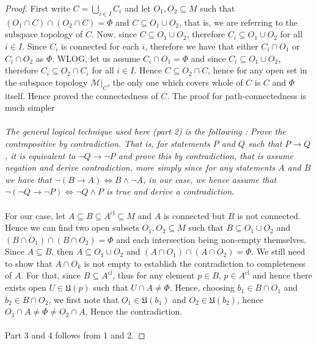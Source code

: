 \documentclass{article}
\theoremstyle{definition}
\theoremstyle{remark}
\theoremstyle{definition}
\theoremstyle{definition}
\newcommand{\topo}[1]{\mathcal{#1}}
\newcommand{\subtopo}[2]{\left. #1 \right\vert_{#2}  }
\newcommand{\nbdsys}[2]{\mathfrak{#1}(#2)}
\newcommand{\closure}[1]{#1^{\text{cl}}}
\newcommand{\union}[0]{\cup}
\newcommand{\intrs}[0]{\cap}
\begin{document}
\begin{proof}
	First write $ C = \bigcup_{i\in I} C_i  $ and let $ O_1, O_2 \subseteq M $ such that $ (O_1 \cap C) \cap (O_2 \cap C)  = \Phi$ and $ C \subseteq O_1 \cup O_2 $, that is, we are referring to the subspace topology of $ C $. Now, since $ C \subseteq O_1\cup O_2 $, therefore $ C_i \subseteq O_1 \cup O_2 $ for all $ i\in I $. Since $ C_i $ is connected for each $ i $, therefore we have that either $ C_i  \cap O_1$ or $ C_i \cap O_2 $ as $ \Phi $. WLOG, let us assume $ C_i \cap O_1 = \Phi$ and since $ C_i \subseteq O_1 \cup O_2  $, therefore $ C_i \subseteq O_2 \cap C_i$ for all $ i\in I $. Hence $ C \subseteq O_2 \cap C $, hence for any open set in the subspace topology $ \subtopo{\topo{M}}{C} $, the only one which covers whole of $ C $ is $ C $ and $ \Phi $ itself. Hence proved the connectedness of $ C $. The proof for path-connectedness is much simpler\\\\
\textit{	The general logical technique used here (part 2) is the following : Prove the contrapositive by contradiction. That is, for statements $ P $ and $ Q $ such that $ P \to Q $, it is equivalent to $ \neg Q \to \neg P $ and prove this by contradiction, that is assume negation and derive contradiction, more simply since for any statements $ A $ and $ B $ we have that $ \neg( B \to A) \Leftrightarrow B \wedge \neg A$, in our case, we hence assume that $ \neg(\neg Q \to \neg P) \Leftrightarrow \neg Q \wedge P$ is true and derive a contradiction.} \\\\
For our case, let $ A \subseteq B \subseteq \closure{A} \subseteq M$ and $ A $ is connected but $ B $ is not connected. Hence we can find two open subsets $ O_1, O_2 \subseteq M $ such that $ B \subseteq O_1 \cup O_2 $ and $ (B\cap O_1) \cap (B\cap O_2) = \Phi $ and each intersection being non-empty themselves. Since $ A\subseteq B $, then $ A\subseteq O_1 \union O_2 $ and $ (A\intrs O_1) \intrs(A\intrs O_2) = \Phi $. We still need to show that $ A\intrs O_k $ is not empty to establish the contradiction to completeness of $ A $. For that, since $ B\subseteq \closure{A} $, thus for any element $ p \in B  $, $ p\in \closure{A} $ and hence there exists open $ U \in \nbdsys{U}{p} $ such that $ U\intrs A \neq \Phi $. Hence, choosing $ b_1 \in B\intrs O_1$ and $ b_2 \in B\intrs O_2 $, we first note that $ O_1 \in \nbdsys{U}{b_1} $ and $ O_2 \in \nbdsys{U}{b_2} $, hence $ O_1 \intrs A \neq \Phi \neq O_2 \intrs A$. Hence the contradiction.\\\\
Part 3 and 4 follows from 1 and 2.
\end{proof}
\end{document}
